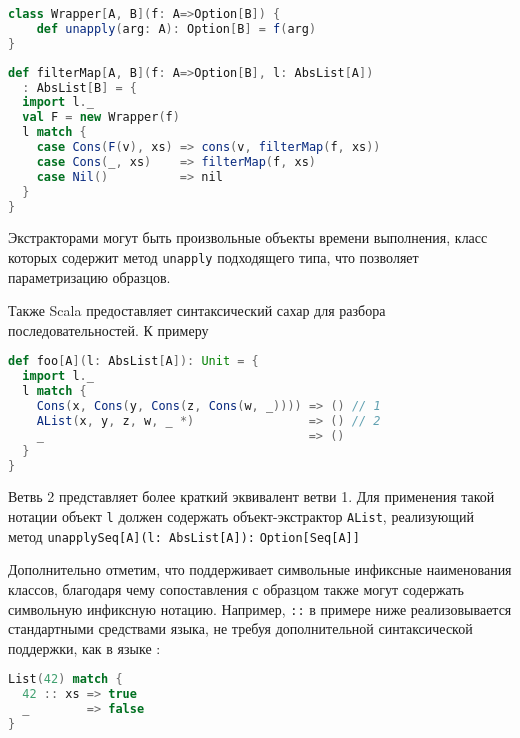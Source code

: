 \noindent
\begin{minipage}{\linewidth}
\begin{lstlisting}[language=scala]
class Wrapper[A, B](f: A=>Option[B]) {
    def unapply(arg: A): Option[B] = f(arg)
}
\end{lstlisting}
\end{minipage}

\noindent
\begin{minipage}{\linewidth}
\begin{lstlisting}[language=scala]
def filterMap[A, B](f: A=>Option[B], l: AbsList[A])
  : AbsList[B] = {
  import l._
  val F = new Wrapper(f)
  l match {
    case Cons(F(v), xs) => cons(v, filterMap(f, xs))
    case Cons(_, xs)    => filterMap(f, xs)
    case Nil()          => nil
  }
}
\end{lstlisting}
\end{minipage}

Экстракторами могут быть произвольные объекты времени выполнения, класс которых содержит метод \lstinline|unapply| подходящего типа, что позволяет параметризацию образцов.

Также Scala предоставляет синтаксический сахар для разбора последовательностей. К примеру

\noindent
\begin{minipage}{\linewidth}
\begin{lstlisting}[language=scala]
def foo[A](l: AbsList[A]): Unit = {
  import l._
  l match {
    Cons(x, Cons(y, Cons(z, Cons(w, _)))) => () // 1
    AList(x, y, z, w, _ *)                => () // 2
    _                                     => ()
  }
}
\end{lstlisting}
\end{minipage}

Ветвь 2 представляет более краткий эквивалент ветви 1. Для применения такой нотации объект \lstinline|l| должен содержать объект-экстрактор \lstinline|AList|, реализующий метод \lstinline[breaklines]|unapplySeq[A](l: AbsList[A]):| \lstinline[breaklines]|Option[Seq[A]]|

Дополнительно отметим, что \Scala{} поддерживает символьные инфиксные наименования классов, благодаря чему сопоставления с образцом также могут содержать символьную инфиксную нотацию. Например, \lstinline|::| в примере ниже реализовывается стандартными средствами языка, не требуя дополнительной синтаксической поддержки, как в языке \ocaml:

\noindent
\raggedbottom
\begin{minipage}{\linewidth}
\begin{lstlisting}[language=scala]
List(42) match {
  42 :: xs => true
  _        => false 
}
\end{lstlisting}
\end{minipage}

